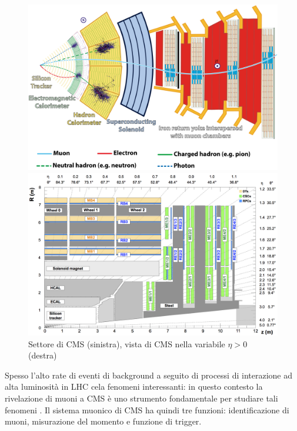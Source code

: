 \begin{figure}[t]
  \centering
  \begin{minipage}[b]{0.48\textwidth}
      \centering
      \includegraphics[width=\textwidth]{../ImmaginiTesi/CMS slice.png} 
  \end{minipage}
  \hfill 
  \begin{minipage}[b]{0.48\textwidth}
      \centering
      \includegraphics[width=\textwidth]{../ImmaginiTesi/CMSEtaView.png} 
  \end{minipage}
  \caption{Settore di CMS (sinistra), vista di CMS  nella variabile $\eta > 0$ (destra)}
  \label{fig:SectorEtaView}
\end{figure}


Spesso l'alto rate di eventi di background a seguito di processi di interazione ad alta luminosità in LHC cela fenomeni interessanti: in questo contesto la rivelazione di muoni a CMS è uno strumento fondamentale per studiare tali fenomeni \cite{TheMuonProject}. Il sistema muonico di CMS ha quindi tre funzioni: identificazione di muoni, misurazione del momento e funzione di trigger.


